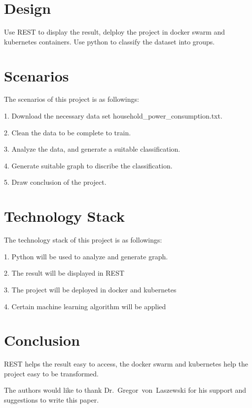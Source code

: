 \section{Design}

Use REST to display the result, delploy the project in docker swarm and kubernetes containers.
Use python to classify the dataset into groups.

\section{Scenarios}

The scenarios of this project is as followings:

1. Download the necessary data set household\_power\_consumption.txt\cite{editor00}.

2. Clean the data to be complete to train.

3. Analyze the data, and generate a suitable classification.

4. Generate suitable graph to discribe the classification.

5. Draw conclusion of the project.


\section{Technology Stack}

The technology stack of this project is as followings:

1. Python will be used to analyze and generate graph.

2. The result will be displayed in REST

3. The project will be deployed in docker and kubernetes

4. Certain machine learning algorithm will be applied


\section{Conclusion}

REST helps the result easy to access, the docker swarm and kubernetes help the project easy to be transformed.


\begin{acks}

  The authors would like to thank Dr.~Gregor~von~Laszewski for his
  support and suggestions to write this paper.

\end{acks}



 

